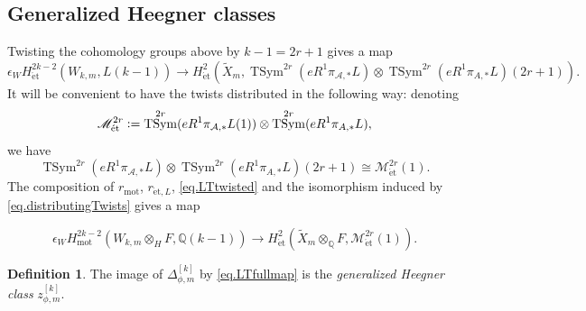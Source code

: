 \documentclass[a4paper]{amsart}
\numberwithin{equation}{section}
\theoremstyle{definition}
\newtheorem{definition}[theorem]{Definition}
\newcommand{\Q}{\mathbb{Q}}
\newcommand{\defeq}{\vcentcolon=}
\DeclareMathOperator{\et}{\text{\'et}}
\DeclareMathOperator{\TSym}{TSym}
\newcommand{\mot}{\mathrm{mot}}
\renewcommand{\et}{\mathrm{\acute{e}t}}
\begin{document}
\subsection{Generalized Heegner classes}\label{subsec.GeneralizedHeegnerClasses}

Twisting the cohomology groups above by $k-1=2r+1$ gives a map
\begin{equation}\label{eq.LTtwisted}
\epsilon_W H_{\et}^{2k-2}(W_{k,m},L(k-1))\longrightarrow H_{\et}^2\left(\widetilde{X}_m,\TSym^{2r}(eR^1\pi_{\mathcal{A},*}L)\otimes \TSym^{2r}(eR^1\pi_{A,*}L)(2r+1)\right).
\end{equation}
It will be convenient to have the twists distributed in the following way: denoting \[\mathscr{M}^{2r}_{\et}\defeq \TSym^{2r}(eR^1\pi_{\mathcal{A},*}L(1))\otimes \TSym^{2r}(eR^1\pi_{A,*}L),\] we have
\begin{equation}\label{eq.distributingTwists}
\TSym^{2r}(eR^1\pi_{\mathcal{A},*}L)\otimes \TSym^{2r}(eR^1\pi_{A,*}L)(2r+1)\cong\mathscr{M}^{2r}_{\et}(1).
\end{equation}
The composition of $r_\mot$, $r_{\et,L}$, \eqref{eq.LTtwisted} and the isomorphism induced by \eqref{eq.distributingTwists} gives a map

\begin{equation}\label{eq.LTfullmap}
\epsilon_{W} H_\mathrm{mot}^{2k-2}(W_{k,m}\otimes_HF,\Q(k-1))\longrightarrow H_{\et}^2\left(\widetilde{X}_m\otimes_\Q F, \mathscr{M}^{2r}_{\et}(1)\right).
\end{equation}

\begin{definition} The image of $\Delta_{\phi,m}^{[k]}$ by \eqref{eq.LTfullmap} is the 
\textit{generalized Heegner class} $z_{\phi,m}^{[k]}$.
\end{definition}
\end{document}
